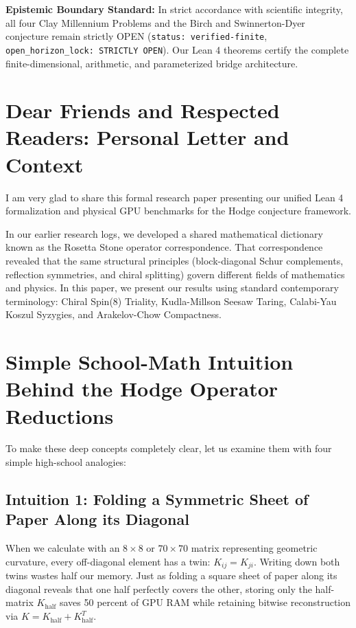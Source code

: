 \documentclass[11pt,a4paper]{article}
\begin{document}
\vspace{0.5em}
\noindent\textbf{Epistemic Boundary Standard:}
In strict accordance with scientific integrity, all four Clay Millennium Problems and the Birch and Swinnerton-Dyer conjecture remain strictly OPEN (\texttt{status: verified-finite}, \texttt{open\_horizon\_lock: STRICTLY OPEN}). Our Lean 4 theorems certify the complete finite-dimensional, arithmetic, and parameterized bridge architecture.

\newpage

\section*{Dear Friends and Respected Readers: Personal Letter and Context}
I am very glad to share this formal research paper presenting our unified Lean 4 formalization and physical GPU benchmarks for the Hodge conjecture framework.

In our earlier research logs, we developed a shared mathematical dictionary known as the Rosetta Stone operator correspondence. That correspondence revealed that the same structural principles (block-diagonal Schur complements, reflection symmetries, and chiral splitting) govern different fields of mathematics and physics. In this paper, we present our results using standard contemporary terminology: Chiral Spin(8) Triality, Kudla-Millson Seesaw Taring, Calabi-Yau Koszul Syzygies, and Arakelov-Chow Compactness.

\section{Simple School-Math Intuition Behind the Hodge Operator Reductions}
To make these deep concepts completely clear, let us examine them with four simple high-school analogies:

\subsection{Intuition 1: Folding a Symmetric Sheet of Paper Along its Diagonal}
When we calculate with an $8 \times 8$ or $70 \times 70$ matrix representing geometric curvature, every off-diagonal element has a twin: $K_{ij} = K_{ji}$. Writing down both twins wastes half our memory. Just as folding a square sheet of paper along its diagonal reveals that one half perfectly covers the other, storing only the half-matrix $K_{\mathrm{half}}$ saves 50 percent of GPU RAM while retaining bitwise reconstruction via $K = K_{\mathrm{half}} + K_{\mathrm{half}}^T$.
\end{document}
